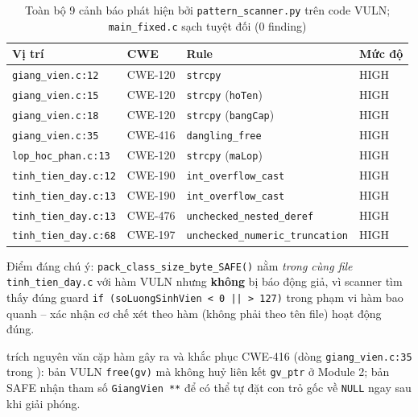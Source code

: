 \begin{table}[H]
  \centering
  \caption{Toàn bộ 9 cảnh báo phát hiện bởi \texttt{pattern\_scanner.py} trên code VULN; \texttt{main\_fixed.c} sạch tuyệt đối (0 finding)}
  \label{tab:findings}
  \small
  \begin{tabularx}{\linewidth}{@{}l l l X@{}}
    \toprule
    \textbf{Vị trí} & \textbf{CWE} & \textbf{Rule} & \textbf{Mức độ} \\
    \midrule
    \texttt{giang\_vien.c:12}     & CWE-120 & \texttt{strcpy}                    & HIGH \\
    \texttt{giang\_vien.c:15}     & CWE-120 & \texttt{strcpy} (\texttt{hoTen})    & HIGH \\
    \texttt{giang\_vien.c:18}     & CWE-120 & \texttt{strcpy} (\texttt{bangCap})  & HIGH \\
    \texttt{giang\_vien.c:35}     & CWE-416 & \texttt{dangling\_free}             & HIGH \\
    \texttt{lop\_hoc\_phan.c:13}  & CWE-120 & \texttt{strcpy} (\texttt{maLop})    & HIGH \\
    \texttt{tinh\_tien\_day.c:12} & CWE-190 & \texttt{int\_overflow\_cast}        & HIGH \\
    \texttt{tinh\_tien\_day.c:13} & CWE-190 & \texttt{int\_overflow\_cast}        & HIGH \\
    \texttt{tinh\_tien\_day.c:13} & CWE-476 & \texttt{unchecked\_nested\_deref}   & HIGH \\
    \texttt{tinh\_tien\_day.c:68} & CWE-197 & \texttt{unchecked\_numeric\_truncation} & HIGH \\
    \bottomrule
  \end{tabularx}
\end{table}

Điểm đáng chú ý: \texttt{pack\_class\_size\_byte\_SAFE()} nằm \emph{trong cùng file} \texttt{tinh\_tien\_day.c} với hàm VULN nhưng \textbf{không} bị báo động giả, vì scanner tìm thấy đúng guard \texttt{if (soLuongSinhVien < 0 || > 127)} trong phạm vi hàm bao quanh -- xác nhận cơ chế xét theo hàm (không phải theo tên file) hoạt động đúng.

 trích nguyên văn cặp hàm gây ra và khắc phục CWE-416 (dòng \texttt{giang\_vien.c:35} trong ): bản VULN \texttt{free(gv)} mà không huỷ liên kết \texttt{gv\_ptr} ở Module 2; bản SAFE nhận tham số \texttt{GiangVien **} để có thể tự đặt con trỏ gốc về \texttt{NULL} ngay sau khi giải phóng.



